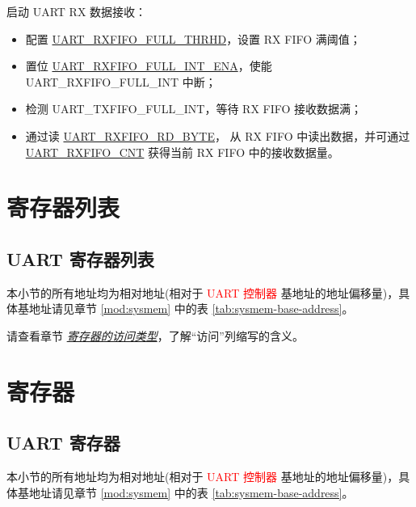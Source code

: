 \documentclass[main\_\_CN.tex]{subfiles}
\begin{document}
启动 UART RX 数据接收：
\begin{itemize}
    \item 配置 \hyperref[fielddesc:UARTRXFIFOFULLTHRHD]{UART\_RXFIFO\_FULL\_THRHD}，设置 RX FIFO 满阈值；
    \item 置位 \hyperref[fielddesc:UARTRXFIFOFULLINTENA]{UART\_RXFIFO\_FULL\_INT\_ENA}，使能 UART\_RXFIFO\_FULL\_INT 中断；
    \item 检测 UART\_TXFIFO\_FULL\_INT，等待 RX FIFO 接收数据满；
    \item 通过读 \hyperref[fielddesc:UARTRXFIFORDBYTE]{UART\_RXFIFO\_RD\_BYTE}， 从 RX FIFO 中读出数据，并可通过 \hyperref[fielddesc:UARTRXFIFOCNT]{UART\_RXFIFO\_CNT} 获得当前 RX FIFO 中的接收数据量。
\end{itemize}





\clearpage
\hypertarget{uart-reg-summ}{}
\section{寄存器列表}
\label{sec:uart-reg-summ}

\subsection{UART 寄存器列表}

本小节的所有地址均为相对地址(相对于 \textcolor{red}{UART 控制器} 基地址的地址偏移量)，具体基地址请见章节 \ref{mod:sysmem} \textit{} 中的表 \ref{tab:sysmem-base-address}。

请查看章节 \hyperref[glossary-access-types]{\textit{寄存器的访问类型}}，了解“访问”列缩写的含义。







\clearpage
\section{寄存器}

\subsection{UART 寄存器}

本小节的所有地址均为相对地址(相对于 \textcolor{red}{UART 控制器} 基地址的地址偏移量)，具体基地址请见章节 \ref{mod:sysmem} \textit{} 中的表 \ref{tab:sysmem-base-address}。


\end{document}
